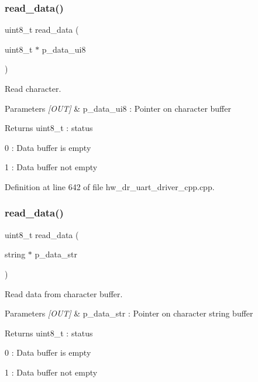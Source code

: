 \subsubsection{read\_data()\hspace{0.1cm}{\footnotesize\ttfamily [1/2]}}
{\footnotesize\ttfamily uint8\+\_\+t read\+\_\+data (\begin{DoxyParamCaption}\item[{uint8\+\_\+t $\ast$}]{p\+\_\+data\+\_\+ui8 }\end{DoxyParamCaption})}



Read character. 


\begin{DoxyParams}{Parameters}
{\em \mbox{[}\+O\+U\+T\mbox{]}} & p\+\_\+data\+\_\+ui8 \+: Pointer on character buffer \\
\hline
\end{DoxyParams}
\begin{DoxyReturn}{Returns}
uint8\+\_\+t \+: status \begin{DoxyItemize}
\item 0 \+: Data buffer is empty \item 1 \+: Data buffer not empty \end{DoxyItemize}

\end{DoxyReturn}


Definition at line 642 of file hw\+\_\+dr\+\_\+uart\+\_\+driver\+\_\+cpp.\+cpp.

\mbox{\label{group___u_a_r_t_ga6a5475b92fcee2a6fc035c94310f064b}} 
\subsubsection{read\_data()\hspace{0.1cm}{\footnotesize\ttfamily [2/2]}}
{\footnotesize\ttfamily uint8\+\_\+t read\+\_\+data (\begin{DoxyParamCaption}\item[{string $\ast$}]{p\+\_\+data\+\_\+str }\end{DoxyParamCaption})}



Read data from character buffer. 


\begin{DoxyParams}{Parameters}
{\em \mbox{[}\+O\+U\+T\mbox{]}} & p\+\_\+data\+\_\+str \+: Pointer on character string buffer \\
\hline
\end{DoxyParams}
\begin{DoxyReturn}{Returns}
uint8\+\_\+t \+: status \begin{DoxyItemize}
\item 0 \+: Data buffer is empty \item 1 \+: Data buffer not empty \end{DoxyItemize}

\end{DoxyReturn}



